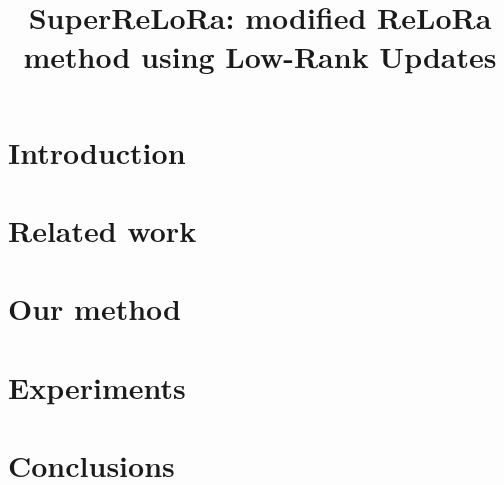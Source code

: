 \documentclass{article}
\title{SuperReLoRa: modified ReLoRa method using Low-Rank Updates}
\begin{document}
\maketitle


\section{Introduction}
    \label{sec:introduction}
    
\section{Related work}
    \label{sec:related}
    
\section{Our method}
    \label{sec:ourmethod}
    
\section{Experiments}
    \label{sec:experiments}
    

\section{Conclusions}
    \label{sec:conclusions}
    

% 


\appendix

\end{document}
